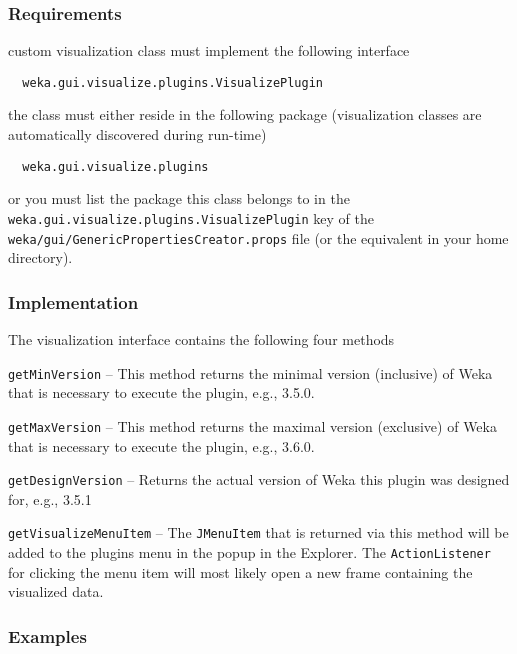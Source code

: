 \subsubsection*{Requirements}
\begin{tight_itemize}
  \item custom visualization class must implement the following interface
  \begin{verbatim}
  weka.gui.visualize.plugins.VisualizePlugin
  \end{verbatim}
  
  \item the class must either reside in the following package (visualization
classes are automatically discovered during run-time)
  \begin{verbatim}
  weka.gui.visualize.plugins
  \end{verbatim}
  
  \item or you must list the package this class belongs to in the
\texttt{weka.gui.visualize.plugins.VisualizePlugin} key of the
\texttt{weka/gui/GenericPropertiesCreator.props} file (or the equivalent in
your home directory).
\end{tight_itemize}

\subsubsection*{Implementation}
The visualization interface contains the following four methods
\begin{tight_itemize}
  \item \texttt{getMinVersion} -- This method returns the minimal version
(inclusive) of Weka that is necessary to execute the plugin, e.g., 3.5.0.
  \item \texttt{getMaxVersion} -- This method returns the maximal version
(exclusive) of Weka that is necessary to execute the plugin, e.g., 3.6.0.
  \item \texttt{getDesignVersion} -- Returns the actual version of Weka
this plugin was designed for, e.g., 3.5.1
  \item \texttt{getVisualizeMenuItem} -- The \texttt{JMenuItem} that is returned
via this method will be added to the plugins menu in the popup in the Explorer.
The \texttt{ActionListener} for clicking the menu item will most likely open a
new frame containing the visualized data.
\end{tight_itemize}

\newpage
\subsubsection*{Examples}
